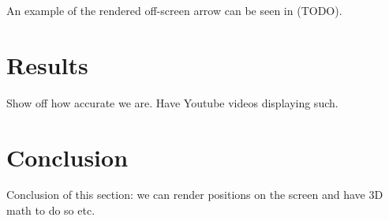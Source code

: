 An example of the rendered off-screen arrow can be seen in (TODO).

\section{Results}
Show off how accurate we are. Have Youtube videos displaying such.

\section{Conclusion}
Conclusion of this section: we can render positions on the screen and have 3D math to do so etc.

